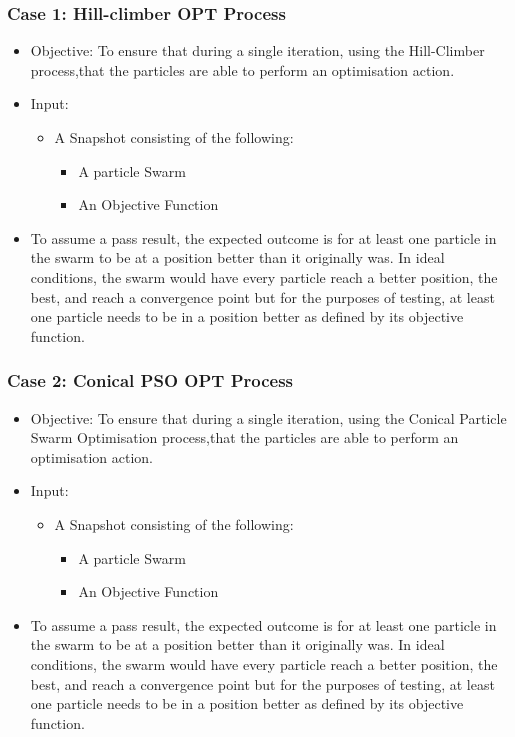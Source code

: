 \documentclass[11pt]{article}
\begin{document}
\subsubsection{Case 1: Hill-climber OPT Process}
\begin{itemize}
    \item Objective: To ensure that during a single iteration, using the Hill-Climber process,that the particles are able to perform an optimisation action.  
    \item Input: \begin{itemize}
    \item A Snapshot consisting of the following:
    	\begin{itemize}
    	\item A particle Swarm
    	\item An Objective Function
    	\end{itemize}
    \end{itemize}
    \item To assume a pass result, the expected outcome is for at least one particle in the swarm to be at a position better than it originally was. In ideal conditions, the swarm would have every particle reach a better position, the best, and reach a convergence point but for the purposes of testing, at least one particle needs to be in a position better as defined by its objective function.
\end{itemize}
\subsubsection{Case 2: Conical PSO OPT Process}
\begin{itemize}
    \item Objective: To ensure that during a single iteration, using the Conical Particle Swarm Optimisation process,that the particles are able to perform an optimisation action.
    \item Input: \begin{itemize}
    \item A Snapshot consisting of the following:
    	\begin{itemize}
    	\item A particle Swarm
    	\item An Objective Function
    	\end{itemize}
    \end{itemize}
    \item To assume a pass result, the expected outcome is for at least one particle in the swarm to be at a position better than it originally was. In ideal conditions, the swarm would have every particle reach a better position, the best, and reach a convergence point but for the purposes of testing, at least one particle needs to be in a position better as defined by its objective function.
\end{itemize}
\end{document}
